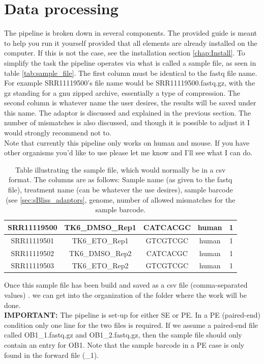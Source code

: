 \section{Data processing \label{sec:sbliss_dta_process}}
The pipeline is broken down in several components. The provided guide is meant to help you run it yourself provided that all elements are already installed on the computer. If this is not the case, see the installation section \autoref{chap:Install}. To simplify the task the pipeline operates via what is called a sample file, as seen in table \autoref{tab:sample_file}. The first column must be identical to the fastq file name. For example SRR11119500's file name would be SRR11119500.fastq.gz, with the gz standing for a gnu zipped archive, essentially a type of compression. The second column is whatever name the user desires, the results will be saved under this name. The adaptor is discussed and explained in the previous section. The number of mismatches is also discussed, and though it is possible to adjust it I would strongly recommend not to.\\
Note that currently this pipeline only works on human and mouse. If you have other organisms you'd like to use please let me know and I'll see what I can do. 

\begin{table}
\caption{Table illustrating the sample file, which would normally be in a csv format. The columns are as follows: Sample name (as given to the fastq file), treatment name (can be whatever the use desires), sample barcode (see \autoref{sec:sBliss_adaptors}, genome, number of allowed mismatches for the sample barcode.} 
\begin{tabular}{|c c c c c|}
\hline
 SRR11119500 & TK6\_DMSO\_Rep1 & CATCACGC & human & 1\\ 
 \hline
 SRR11119501 & TK6\_ETO\_Rep1 & GTCGTCGC & human & 1\\
 \hline
 SRR11119502 & TK6\_DMSO\_Rep2 & CATCACGC & human & 1\\
 \hline
 SRR11119503 & TK6\_ETO\_Rep2 & GTCGTCGC & human & 1\\
 \hline
\end{tabular}
\label{tab:sample_file}
\end{table}

Once this sample file has been build and saved as a csv file (comma-separated values) . we can get into the organization of the folder where the work will be done.\\
\textbf{IMPORTANT: }The pipeline is set-up for either SE or PE. In a PE (paired-end) condition only one line for the two files is required. If we assume a paired-end file called OB1\_1.fastq.gz and OB1\_2.fastq.gz, then the sample file should only contain an entry for OB1. Note that the sample barcode in a PE case is only found in the forward file (\_1).

